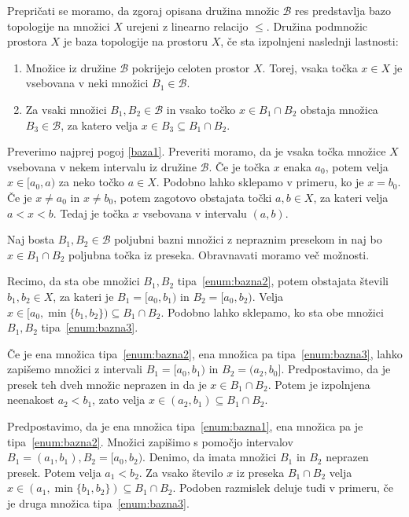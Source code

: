 \documentclass[../TG_magistrsko_delo_sections.tex]{subfiles}
\begin{document}
Prepričati se moramo, da zgoraj opisana družina množic $\mathcal{B}$ res predstavlja bazo topologije na množici $X$ urejeni z linearno relacijo $\leq$. Družina podmnožic prostora $X$ je baza topologije na prostoru $X$, če sta izpolnjeni naslednji lastnosti:
\begin{enumerate}[label={(b\arabic*)}]
\item Množice iz družine $\mathcal{B}$ pokrijejo celoten prostor $X$. Torej, vsaka točka $x \in X$ je vsebovana v neki množici $B_1 \in \mathcal{B}$. \label{baza1}
\item Za vsaki množici $B_1, B_2 \in \mathcal{B}$ in vsako točko $x\in B_1 \cap B_2$ obstaja množica $B_3 \in \mathcal{B}$, za katero velja $x \in B_3 \subseteq B_1 \cap B_2$.\label{baza2}
\end{enumerate}

Preverimo najprej pogoj \ref{baza1}.
Preveriti moramo, da je vsaka točka množice $X$ vsebovana v nekem intervalu iz družine $\mathcal{B}$. Če je točka $x$ enaka $a_0$, potem velja $x \in [a_0, a)$ za neko točko $a \in X$. Podobno lahko sklepamo v primeru, ko je $x = b_0$. Če je $x \neq a_0$ in $x \neq b_0$, potem zagotovo obstajata točki $a, b \in X$, za kateri velja $a < x < b$. Tedaj je točka $x$ vsebovana v intervalu $(a, b)$.

Naj bosta $B_1, B_2 \in \mathcal{B}$ poljubni bazni množici z nepraznim presekom in naj bo $x \in B_1 \cap B_2$ poljubna točka iz preseka. Obravnavati moramo več možnosti. 

Recimo, da sta obe množici $B_1, B_2$ tipa~\ref{enum:bazna2}, potem obstajata števili $b_1, b_2 \in X$, za kateri je $B_1 = [a_0, b_1)$ in $B_2 = [a_0, b_2)$. Velja $x \in [a_0, \min\{b_1, b_2\}) \subseteq B_1 \cap B_2$. Podobno lahko sklepamo, ko sta obe množici $B_1, B_2$ tipa~\ref{enum:bazna3}.

Če je ena množica tipa~\ref{enum:bazna2}, ena množica pa tipa~\ref{enum:bazna3}, lahko zapišemo množici z intervali $B_1 = [a_0, b_1)$ in $B_2 = (a_2, b_0]$. Predpostavimo, da je presek teh dveh množic neprazen in da je $x \in B_1 \cap B_2$. Potem je izpolnjena neenakost $a_2 < b_1$, zato velja $x \in (a_2, b_1) \subseteq B_1 \cap B_2$.

Predpostavimo, da je ena množica tipa~\ref{enum:bazna1}, ena množica pa je tipa~\ref{enum:bazna2}. Množici zapišimo s pomočjo intervalov $B_1 = (a_1, b_1), B_2 = [a_0, b_2)$. Denimo, da imata množici $B_1$ in $B_2$ neprazen presek. Potem velja $a_1 < b_2$. Za vsako število $x$ iz preseka $B_1 \cap B_2$ velja $x \in (a_1, \min\{b_1, b_2\}) \subseteq B_1 \cap B_2$. Podoben razmislek deluje tudi v primeru, če je druga množica tipa~\ref{enum:bazna3}.
\end{document}

